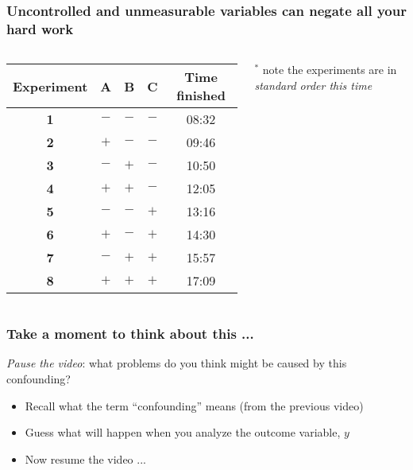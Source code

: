 \documentclass[handout,11pt,aspectratio=169,mathserif]{beamer}
\begin{document}
\begin{frame}\frametitle{Uncontrolled and unmeasurable variables can negate all your hard work}
	

	\begin{columns}[T]
			
			\vspace{1cm}
			\begin{tabulary}{\linewidth}{ccccc}\hline 
				\textbf{\relax Experiment } & \textbf{\relax A } & \textbf{\relax B } & \textbf{\relax C } & \textbf{\relax Time finished} \\
				\hline 
				\textbf{1} & \(-\) & \(-\) & \(-\) & 08:32\\
				\textbf{2} & \(+\) & \(-\) & \(-\) & 09:46\\
				\textbf{3} & \(-\) & \(+\) & \(-\) & 10:50\\
				\textbf{4} & \(+\) & \(+\) & \(-\) & 12:05\\
				\textbf{5} & \(-\) & \(-\) & \(+\) & 13:16\\
				\textbf{6} & \(+\) & \(-\) & \(+\) & 14:30\\
				\textbf{7} & \(-\) & \(+\) & \(+\) & 15:57\\
				\textbf{8} & \(+\) & \(+\) & \(+\) & 17:09\\
				 \hline
			\end{tabulary}
			
			\vspace{0.2cm}
			{\scriptsize $^\ast$ note the experiments are in \emph{standard order this time}}

	\end{columns}	
\end{frame}

\begin{frame}\frametitle{Take a moment to think about this ...}
	\begin{exampleblock}{}
		\emph{Pause the video}: what problems do you think might be caused by this confounding?
		
		\vspace{1cm}
		\begin{itemize}
			\item	Recall what the term ``confounding'' means (from the previous video)
			\item	Guess what will happen when you analyze the outcome variable, $y$
			\item	Now resume the video ...
			
		\end{itemize}
	\end{exampleblock}
\end{frame}
\end{document}
